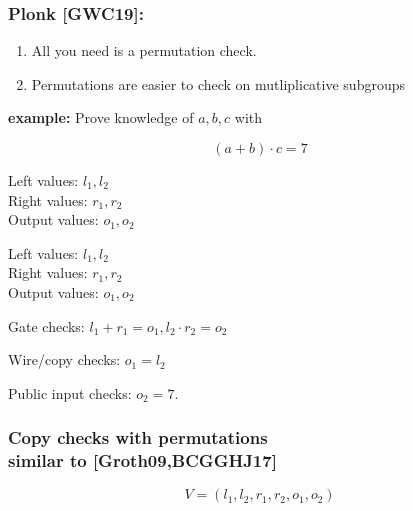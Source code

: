 \documentclass[shadesubsections,trans,14pt,mathserif]{beamer}
\newcommand{\F}{\ensuremath{\mathbb F}}
\newcommand{\polysofdeg}[1]{\F_{< #1}[X]}
\begin{document}
\begin{frame}
\frametitle{Plonk \normalsize{[GWC19]}:}   %
 
  \begin{enumerate}

\item All you need is a permutation check.
 \item Permutations are easier to check on mutliplicative subgroups
\end{enumerate}


\end{frame}
\begin{frame}
\textbf{example:} Prove knowledge of $a,b,c$ with

 
\[(a+b)\cdot c =7\]




\end{frame}


\begin{frame}
Left values: 
$l_1,l_2$\\
Right values: $r_1,r_2$\\
Output values:
$o_1,o_2$


 \vspace{0.2in}

\end{frame}

\begin{frame}
Left values: 
$l_1,l_2$\\
Right values: $r_1,r_2$\\
Output values:
$o_1,o_2$


 \vspace{0.2in}

Gate checks:
 $l_1 + r_1 = o_1 , l_2\cdot r_2 = o_2$


Wire/copy checks:
$o_1 = l_2$

Public input checks: $o_2=7$.
\end{frame}





\begin{frame}

\frametitle{Copy checks with permutations\\ \normalsize{similar to [Groth09,BCGGHJ17]}}   %
 
 
 \[V= (l_1,l_2,r_1,r_2,o_1,o_2)\]
 
 

\end{frame}
\end{document}
